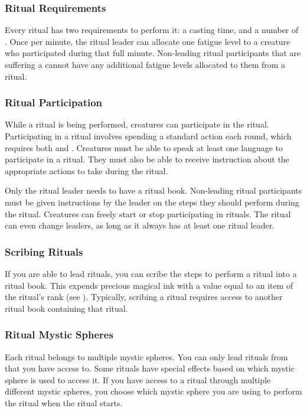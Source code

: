    \subsubsection{Ritual Requirements}\label{Ritual Requirements}
      Every ritual has two requirements to perform it: a casting time, and a number of .
      Once per minute, the ritual leader can allocate one fatigue level to a creature who participated during that full minute.
      Non-leading ritual participants that are suffering a  cannot have any additional fatigue levels allocated to them from a ritual.

    \subsubsection{Ritual Participation}
      While a ritual is being performed, creatures can participate in the ritual.
      Participating in a ritual involves spending a standard action each round, which requires both  and .
      Creatures must be able to speak at least one language to participate in a ritual.
      They must also be able to receive instruction about the appropriate actions to take during the ritual.

      Only the ritual leader needs to have a ritual book.
      Non-leading ritual participants must be given instructions by the leader on the steps they should perform during the ritual.
      Creatures can freely start or stop participating in rituals.
      The ritual can even change leaders, as long as it always has at least one ritual leader.

    \subsubsection{Scribing Rituals}
      If you are able to lead rituals, you can scribe the steps to perform a ritual into a ritual book.
      This expends precious magical ink with a value equal to an item of the ritual's rank (see ).
      Typically, scribing a ritual requires access to another ritual book containing that ritual.

    \subsubsection{Ritual Mystic Spheres}
      Each ritual belongs to multiple mystic spheres.
      You can only lead rituals from  that you have access to.
      Some rituals have special effects based on which mystic sphere is used to access it.
      If you have access to a ritual through multiple different mystic spheres, you choose which mystic sphere you are using to perform the ritual when the ritual starts.

